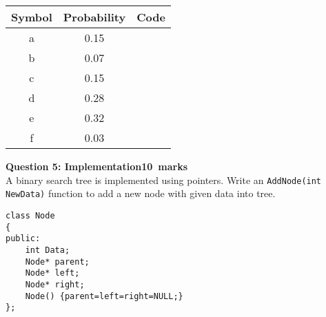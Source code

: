\documentclass[12pt,a4paper]{article}
\def\Qfive{10}
\def\SingleSpacing{\def\baselinestretch{1}\large\normalsize}
\begin{document}
\begin{table}[H]
\begin{center}
\vspace{0.3cm}
\SingleSpacing
	\begin{tabular}{ccc}
	\hline \hline
		\rule{0pt}{2.6ex}\textbf{Symbol} & \textbf{Probability} & \textbf{Code}\\
		\hline
		\rule{0pt}{2.6ex}a & 0.15 & \\
		b& 0.07 & \\
		c& 0.15 & \\
		d& 0.28 & \\
		e& 0.32 & \\
		f& 0.03 & \\
	\hline \hline
	\end{tabular}
\end{center}
\end{table}
\newpage
\noindent\textbf{Question 5: Implementation\hfill \Qfive~marks}\\
A binary search tree is implemented using pointers. Write an \verb|AddNode(int NewData)| function to add a new node with given data into tree.
\begin{lstlisting}
class Node
{
public:
	int Data;
	Node* parent;
	Node* left;
	Node* right;
	Node() {parent=left=right=NULL;}
};
\end{lstlisting}
\end{document}
